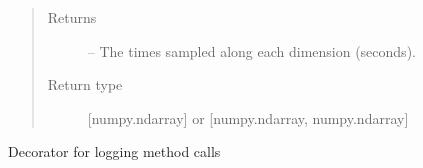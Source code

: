 \documentclass[letterpaper,10pt,english]{sphinxmanual}
\begin{document}
\begin{fulllineitems}
\begin{fulllineitems}
\begin{quote}
\begin{description}
\item[{Returns}] \leavevmode
\sphinxAtStartPar
{} – The times sampled along each dimension (seconds).

\item[{Return type}] \leavevmode
\sphinxAtStartPar
{[}numpy.ndarray{]} or {[}numpy.ndarray, numpy.ndarray{]}

\end{description}\end{quote}

\end{fulllineitems}


\begin{fulllineitems}
\label{\detokenize{references/core:nmrespy.core.Estimator.logger}}
\sphinxAtStartPar
Decorator for logging {\hyperref[\detokenize{references/core:nmrespy.core.Estimator}]{}} method calls

\end{fulllineitems}



\end{fulllineitems}
\end{document}
